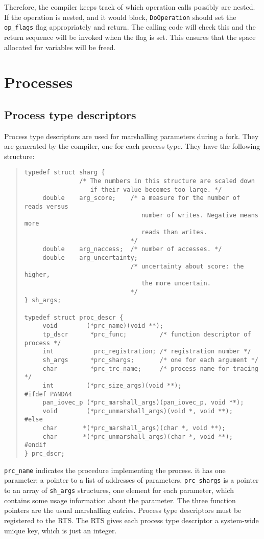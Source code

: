\documentclass[10pt]{article}
\begin{document}
Therefore, the compiler keeps track of which operation calls possibly are
nested.
If the operation is nested, and it would block, \verb+DoOperation+ should
set the \verb+op_flags+ flag appropriately and return.
The calling code will check this and the return sequence will be invoked
when the flag is set.
This ensures that the space allocated for variables will be freed.

\section{Processes}\label{sec:procs}

\subsection{Process type descriptors}
Process type descriptors are used for marshalling parameters during a fork.
They are generated by the compiler, one for each process type.
They have the following structure:
\begin{quote}
\begin{verbatim}
typedef struct sharg {
               /* The numbers in this structure are scaled down
                  if their value becomes too large. */
     double    arg_score;    /* a measure for the number of reads versus
                                number of writes. Negative means more
                                reads than writes.
                             */
     double    arg_naccess;  /* number of accesses. */
     double    arg_uncertainty;
                             /* uncertainty about score: the higher,
                                the more uncertain.
                             */
} sh_args;

typedef struct proc_descr {
     void        (*prc_name)(void **);
     tp_dscr      *prc_func;         /* function descriptor of process */
     int           prc_registration; /* registration number */
     sh_args      *prc_shargs;       /* one for each argument */
     char         *prc_trc_name;     /* process name for tracing */
     int         (*prc_size_args)(void **);
#ifdef PANDA4
     pan_iovec_p (*prc_marshall_args)(pan_iovec_p, void **);
     void        (*prc_unmarshall_args)(void *, void **);
#else
     char       *(*prc_marshall_args)(char *, void **);
     char       *(*prc_unmarshall_args)(char *, void **);
#endif
} prc_dscr;
\end{verbatim}
\end{quote}
\verb+prc_name+ indicates the procedure implementing the process.
it has one parameter: a pointer to a list of addresses of parameters.
\verb+prc_shargs+
is a pointer to an array of \verb+sh_args+
structures,
one element for each parameter,
which contains some usage information about the parameter.
The three function pointers are the usual marshalling entries.
Process type descriptors must be registered to the RTS.
The RTS gives each process type descriptor a system-wide unique key, which is
just an integer.
\end{document}
